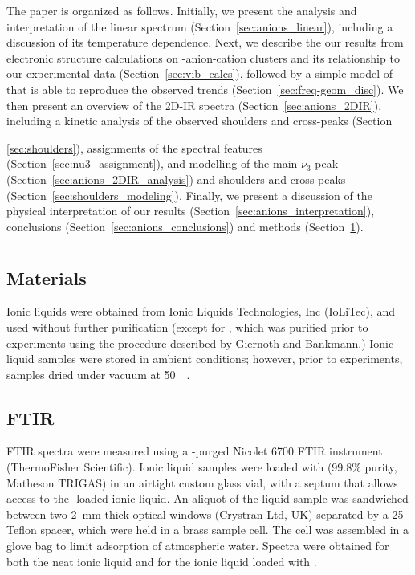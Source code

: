 The paper is organized as follows. Initially, we present the analysis and interpretation of the linear  spectrum (Section~\ref{sec:anions_linear}), including a discussion of its temperature dependence. Next, we describe the our results from electronic structure calculations on -anion-cation clusters and its relationship to our experimental data (Section~\ref{sec:vib_calcs}), followed by a simple model of  that is able to reproduce the observed trends (Section~\ref{sec:freq-geom_disc}). We then present an overview of the 2D-IR spectra (Section~\ref{sec:anions_2DIR}), including a kinetic analysis of the observed shoulders and cross-peaks (Section~{\ref{sec:shoulders}), assignments of the spectral features (Section~\ref{sec:nu3_assignment}), and modelling of the main \(\nu_3\) peak (Section~\ref{sec:anions_2DIR_analysis}) and shoulders and cross-peaks (Section~\ref{sec:shoulders_modeling}). Finally, we present a discussion of the physical interpretation of our results (Section~\ref{sec:anions_interpretation}), conclusions (Section~\ref{sec:anions_conclusions}) and methods (Section~\ref{sec:anions_methods}).

\section{\texorpdfstring{}{Methods}}
\label{sec:anions_methods}

\subsection{Materials}
\label{sec:anions_methods_materials}
Ionic liquids were obtained from Ionic Liquids Technologies, Inc (IoLiTec), and used without further purification (except for \ce{[Im_{4,1}][BF4]}, which was purified prior to experiments using the procedure described by Giernoth and Bankmann.\cite{Giernoth2008}) Ionic liquid samples were stored in ambient conditions; however, prior to experiments, samples dried under vacuum at \SI{50}{\milli\torr}.

\subsection{FTIR}
\label{sec:anions_methods_ftir}
FTIR spectra were measured using a -purged Nicolet 6700 FTIR instrument (ThermoFisher Scientific). Ionic liquid samples were loaded with  (99.8\% purity, Matheson TRIGAS) in an airtight custom glass vial, with a septum that allows access to the -loaded ionic liquid. An aliquot of the liquid sample was sandwiched between two 2~mm-thick  optical windows (Crystran Ltd, UK) separated by a \SI{25}{\micron} Teflon spacer, which were held in a brass sample cell. The cell was assembled in a glove bag to limit adsorption of atmospheric water. Spectra were obtained for both the neat ionic liquid and for the ionic liquid loaded with .

}
